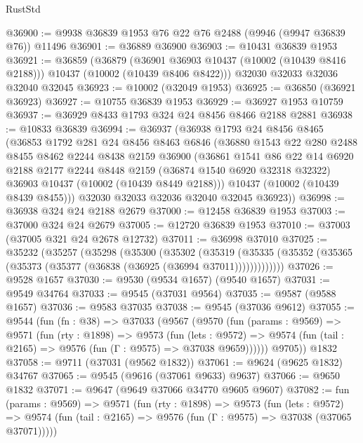 \begin{lexlean}{RustStd}
\begin{coremodule}
@36900 := @9938 @36839 @1953 @76 @22 @76 @2488 (@9946 (@9947 @36839 @76)) @11496
@36901 := @36889 @36900
@36903 := @10431 @36839 @1953
@36921 := @36859
    (@36879
      (@36901 @36903 @10437 (@10002 (@10439 @8416 @2188)))
      @10437
      (@10002 (@10439 @8406 @8422)))
    @32030
    @32033
    @32036
    @32040
    @32045
@36923 := @10002 (@32049 @1953)
@36925 := @36850 (@36921 @36923)
@36927 := @10755 @36839 @1953
@36929 := @36927 @1953 @10759
@36937 := @36929 @8433 @1793 @324 @24 @8456 @8466 @2188 @2881
@36938 := @10833 @36839
@36994 := @36937
    (@36938
      @1793
      @24
      @8456
      @8465
      (@36853
        @1792
        @281
        @24
        @8456
        @8463
        @6846
        (@36880
          @1543
          @22
          @280
          @2488
          @8455
          @8462
          @2244
          @8438
          @2159
          @36900
          (@36861
            @1541
            @86
            @22
            @14
            @6920
            @2188
            @2177
            @2244
            @8448
            @2159
            (@36874 @1540 @6920 @32318 @32322)
            @36903
            @10437
            (@10002 (@10439 @8449 @2188)))
          @10437
          (@10002 (@10439 @8439 @8455)))
        @32030
        @32033
        @32036
        @32040
        @32045
        @36923))
@36998 := @36938 @324 @24 @2188 @2679
@37000 := @12458 @36839 @1953
@37003 := @37000 @324 @24 @2679
@37005 := @12720 @36839 @1953
@37010 := @37003 (@37005 @321 @24 @2678 @12732)
@37011 := @36998 @37010
@37025 := @35232
    (@35257
      (@35298
        (@35300
          (@35302
            (@35319
              (@35335 (@35352 (@35365 (@35373 (@35377 (@36838 (@36925 (@36994 @37011)))))))))))))
@37026 := @9528 @1657
@37030 := @9530 (@9534 @1657) (@9540 @1657)
@37031 := @9549 @34764
@37033 := @9545 (@37031 @9564)
@37035 := @9587 (@9588 @1657)
@37036 := @9583 @37035
@37038 := @9545 (@37036 @9612)
@37055 := @9544
    (fun (fn : @38) =>
    @37033
      (@9567
        (@9570
          (fun (params : @9569) =>
          @9571
            (fun (rty : @1898) =>
            @9573
              (fun (lets : @9572) =>
              @9574 (fun (tail : @2165) => @9576 (fun (Γ : @9575) => @37038 @9659))))))
        @9705))
    @1832
@37058 := @9711 (@37031 (@9562 @1832))
@37061 := @9624 (@9625 @1832) @34767
@37065 := @9545 (@9616 (@37061 @9633) @9637)
@37066 := @9650 @1832
@37071 := @9647 (@9649 @37066 @34770 @9605 @9607)
@37082 := fun (params : @9569) =>
  @9571
    (fun (rty : @1898) =>
    @9573
      (fun (lets : @9572) =>
      @9574 (fun (tail : @2165) => @9576 (fun (Γ : @9575) => @37038 (@37065 @37071)))))

\end{coremodule}
\end{lexlean}
